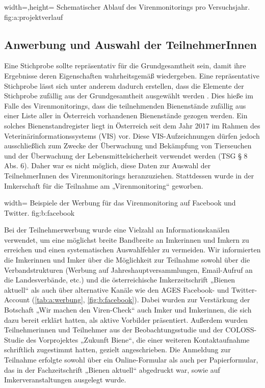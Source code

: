 {width=\textwidth,height=\textheight}
{Schematischer Ablauf des Virenmonitorings pro Versuchsjahr.}%
{}%
{fig:a:projektverlauf}%


\subsection{Anwerbung und Auswahl der TeilnehmerInnen}\label{chap:werbung}

Eine Stichprobe sollte repräsentativ für die Grundgesamtheit sein, damit ihre Ergebnisse deren Eigenschaften wahrheitsgemäß wiedergeben. Eine repräsentative Stichprobe lässt sich unter anderem dadurch erstellen, dass die Elemente der Stichprobe zufällig aus der Grundgesamtheit ausgewählt werden \citep{vanderzee2013}. Dies hieße im Falle des Virenmonitorings, dass die teilnehmenden Bienenstände zufällig aus einer Liste aller in Österreich vorhandenen Bienenstände gezogen werden. Ein solches Bienenstandregister liegt in Österreich seit dem Jahr 2017 im Rahmen des Veterinärinformationssystems (VIS) vor. Diese VIS-Aufzeichnungen dürfen jedoch ausschließlich zum Zwecke der Überwachung und Bekämpfung von Tierseuchen und der Überwachung der Lebensmittelsicherheit verwendet werden (TSG § 8 Abs. 6). Daher war es nicht möglich, diese Daten zur Auswahl der TeilnehmerInnen des Virenmonitorings heranzuziehen. Stattdessen wurde in der Imkerschaft für die Teilnahme am „Virenmonitoring“ geworben. 

  {width=\textwidth} %
  {Beispiele der Werbung für das Virenmonitoring auf Facebook und Twitter.} %
  {} %
  {fig:b:facebook} %

Bei der Teilnehmerwerbung wurde eine Vielzahl an Informationskanälen verwendet, um eine möglichst breite Bandbreite an Imkerinnen und Imkern zu erreichen und einen systematischen Auswahlfehler zu vermeiden. Wir informierten die Imkerinnen und Imker über die Möglichkeit zur Teilnahme sowohl über die Verbandstrukturen (Werbung auf Jahreshauptversammlungen, Email-Aufruf an die Landesverbände, etc.) und die österreichische Imkerzeitschrift „Bienen aktuell“ als auch über alternative Kanäle wie den AGES Facebook- und Twitter-Account (\cref{tab:a:werbung}, \cref{fig:b:facebook}). Dabei wurden zur Verstärkung der Botschaft „Wir machen den Viren-Check“ auch Imker und Imkerinnen, die sich dazu bereit erklärt hatten, als aktive Vorbilder präsentiert.
Außerdem wurden Teilnehmerinnen und Teilnehmer aus der Beobachtungsstudie und der COLOSS-Studie des Vorprojektes „Zukunft Biene“, die einer weiteren Kontaktaufnahme schriftlich zugestimmt hatten, gezielt angeschrieben. Die Anmeldung zur Teilnahme erfolgte sowohl über ein Online-Formular als auch per Papierformular, das in der Fachzeitschrift „Bienen aktuell“ abgedruckt war, sowie auf Imkerveranstaltungen ausgelegt wurde.

